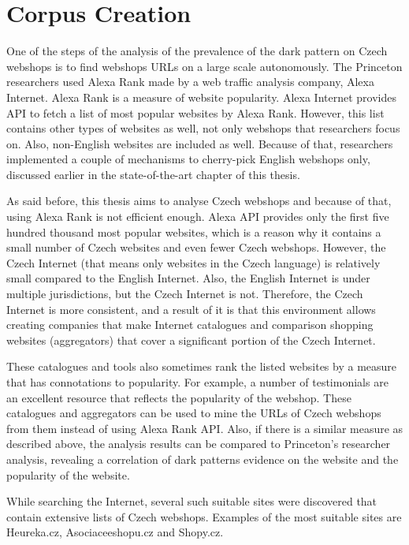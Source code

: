 \chapter{Corpus Creation}

One of the steps of the analysis of the prevalence of the dark pattern on Czech webshops is to find webshops URLs on a large scale autonomously. The Princeton researchers used Alexa Rank\cite{alexa-topsites} made by a web traffic analysis company, Alexa Internet. Alexa Rank is a measure of website popularity. Alexa Internet provides API to fetch a list of most popular websites by Alexa Rank. However, this list contains other types of websites as well, not only webshops that researchers focus on. Also, non-English websites are included as well. Because of that, researchers implemented a couple of mechanisms to cherry-pick English webshops only, discussed earlier in the state-of-the-art chapter of this thesis.

As said before, this thesis aims to analyse Czech webshops and because of that, using Alexa Rank is not efficient enough. Alexa API provides only the first five hundred thousand most popular websites, which is a reason why it contains a small number of Czech websites and even fewer Czech webshops. However, the Czech Internet (that means only websites in the Czech language) is relatively small compared to the English Internet. Also, the English Internet is under multiple jurisdictions, but the Czech Internet is not. Therefore, the Czech Internet is more consistent, and a result of it is that this environment allows creating companies that make Internet catalogues and comparison shopping websites (aggregators) that cover a significant portion of the Czech Internet. 

These catalogues and tools also sometimes rank the listed websites by a measure that has connotations to popularity. For example, a number of testimonials are an excellent resource that reflects the popularity of the webshop. These catalogues and aggregators can be used to mine the URLs of Czech webshops from them instead of using Alexa Rank API. Also, if there is a similar measure as described above, the analysis results can be compared to Princeton's researcher analysis, revealing a correlation of dark patterns evidence on the website and the popularity of the website.

While searching the Internet, several such suitable sites were discovered that contain extensive lists of Czech webshops. Examples of the most suitable sites are Heureka.cz, Asociaceeshopu.cz and Shopy.cz.

